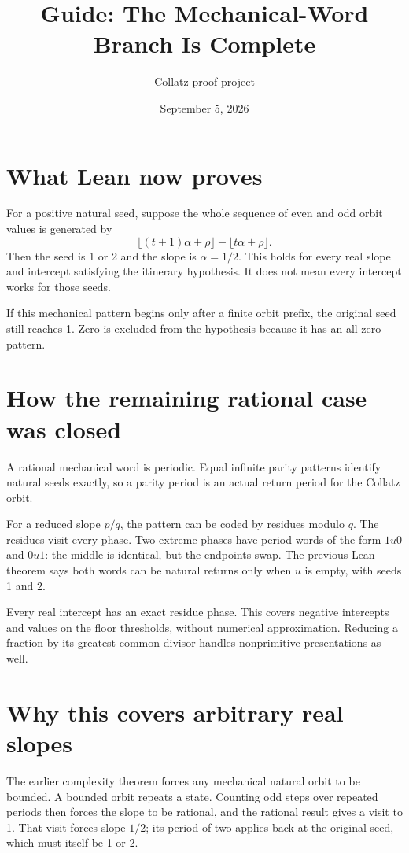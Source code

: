 \documentclass[10pt]{article}
\title{Guide: The Mechanical-Word Branch Is Complete}
\author{Collatz proof project}
\date{September 5, 2026}
\begin{document}
\maketitle
\section*{What Lean now proves}
For a positive natural seed, suppose the whole sequence of even and odd
orbit values is generated by
\[
 \lfloor(t+1)\alpha+\rho\rfloor-\lfloor t\alpha+\rho\rfloor.
\]
Then the seed is 1 or 2 and the slope is $\alpha=1/2$. This holds for every
real slope and intercept satisfying the itinerary hypothesis. It does not
mean every intercept works for those seeds.

If this mechanical pattern begins only after a finite orbit prefix, the
original seed still reaches 1. Zero is excluded from the hypothesis because
it has an all-zero pattern.

\section*{How the remaining rational case was closed}
A rational mechanical word is periodic. Equal infinite parity patterns
identify natural seeds exactly, so a parity period is an actual return
period for the Collatz orbit.

For a reduced slope $p/q$, the pattern can be coded by residues modulo $q$.
The residues visit every phase. Two extreme phases have period words of
the form $1u0$ and $0u1$: the middle is identical, but the endpoints swap.
The previous Lean theorem says both words can be natural returns only when
$u$ is empty, with seeds 1 and 2.

Every real intercept has an exact residue phase. This covers negative
intercepts and values on the floor thresholds, without numerical
approximation. Reducing a fraction by its greatest common divisor handles
nonprimitive presentations as well.

\section*{Why this covers arbitrary real slopes}
The earlier complexity theorem forces any mechanical natural orbit to be
bounded. A bounded orbit repeats a state. Counting odd steps over repeated
periods then forces the slope to be rational, and the rational result gives
a visit to 1. That visit forces slope $1/2$; its period of two applies back
at the original seed, which must itself be 1 or 2.
\end{document}
